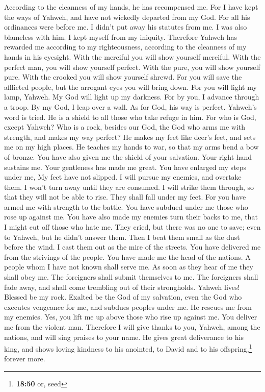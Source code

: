 According to the cleanness of my hands, he has recompensed me.
 For I have kept the ways of Yahweh, and have not
wickedly departed from my God.  For all his ordinances
were before me. I didn't put away his statutes from me. 
I was also blameless with him. I kept myself from my iniquity.
 Therefore Yahweh has rewarded me according to my
righteousness, according to the cleanness of my hands in his eyesight.
 With the merciful you will show yourself merciful. With
the perfect man, you will show yourself perfect.  With
the pure, you will show yourself pure. With the crooked you will show
yourself shrewd.  For you will save the afflicted people,
but the arrogant eyes you will bring down.  For you will
light my lamp, Yahweh. My God will light up my darkness. 
For by you, I advance through a troop. By my God, I leap over a wall.
 As for God, his way is perfect. Yahweh's word is tried.
He is a shield to all those who take refuge in him.  For
who is God, except Yahweh? Who is a rock, besides our God,
 the God who arms me with strength, and makes my way
perfect?  He makes my feet like deer's feet, and sets me
on my high places.  He teaches my hands to war, so that
my arms bend a bow of bronze.  You have also given me the
shield of your salvation. Your right hand sustains me. Your gentleness
has made me great.  You have enlarged my steps under me,
My feet have not slipped.  I will pursue my enemies, and
overtake them. I won't turn away until they are consumed.
 I will strike them through, so that they will not be
able to rise. They shall fall under my feet.  For you
have armed me with strength to the battle. You have subdued under me
those who rose up against me.  You have also made my
enemies turn their backs to me, that I might cut off those who hate me.
 They cried, but there was no one to save; even to
Yahweh, but he didn't answer them.  Then I beat them
small as the dust before the wind. I cast them out as the mire of the
streets.  You have delivered me from the strivings of the
people. You have made me the head of the nations. A people whom I have
not known shall serve me.  As soon as they hear of me
they shall obey me. The foreigners shall submit themselves to me.
 The foreigners shall fade away, and shall come trembling
out of their strongholds.  Yahweh lives! Blessed be my
rock. Exalted be the God of my salvation,  even the God
who executes vengeance for me, and subdues peoples under me.
 He rescues me from my enemies. Yes, you lift me up above
those who rise up against me. You deliver me from the violent man.
 Therefore I will give thanks to you, Yahweh, among the
nations, and will sing praises to your name.  He gives
great deliverance to his king, and shows loving kindness to his
anointed, to David and to his offspring,\footnote{\textbf{18:50} or,
  seed} forever more.

